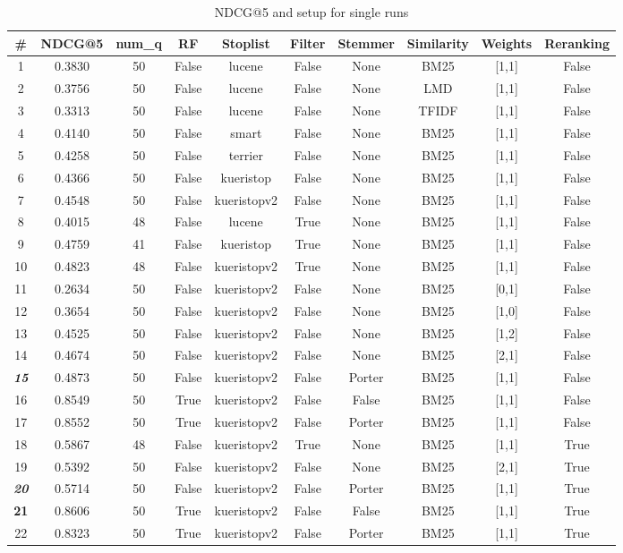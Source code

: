 \begin{table}[b]
	\caption{NDCG@5 and setup for single runs}
	\label{tab:results-table}
	\centering
	\begin{tabular}{|c||c|c||c|c|c|c|c|c|c|}
		\toprule
		\# & NDCG@5 & num\_q  & RF & Stoplist & Filter & Stemmer & Similarity & Weights & Reranking \\
		\midrule
		1 & 0.3830 & 50 & False & lucene & False & None & BM25 & [1,1] & False \\
		2 & 0.3756 & 50 & False & lucene & False & None & LMD & [1,1] & False \\
		3 & 0.3313 & 50 & False & lucene & False & None & TFIDF & [1,1] & False \\
		\hline
		4 & 0.4140 & 50 & False & smart & False & None & BM25 & [1,1] & False \\
		5 & 0.4258 & 50 & False & terrier & False & None & BM25 & [1,1] & False \\
		6 & 0.4366 & 50 & False & kueristop & False & None & BM25 & [1,1] & False \\
		7 & 0.4548 & 50 & False & kueristopv2 & False & None & BM25 & [1,1] & False \\
		\hline
		8 & 0.4015 & 48 & False & lucene & True & None & BM25 & [1,1] & False \\
		9 & 0.4759 & 41 & False & kueristop & True & None & BM25 & [1,1] & False \\
		10 & 0.4823 & 48 & False & kueristopv2 & True & None & BM25 & [1,1] & False \\
		\hline
		11 & 0.2634 & 50 & False & kueristopv2 & False & None & BM25 & [0,1] & False \\
		12 & 0.3654 & 50 & False & kueristopv2 & False & None & BM25 & [1,0] & False \\
		13 & 0.4525 & 50 & False & kueristopv2 & False & None & BM25 & [1,2] & False \\
		14 & 0.4674 & 50 & False & kueristopv2 & False & None & BM25 & [2,1] & False \\
		\hline
		\textit{\textbf{15}} & 0.4873 & 50 & False & kueristopv2 & False & Porter & BM25 & [1,1] & False \\
		\hline
		16 & 0.8549 & 50 & True & kueristopv2 & False & False & BM25 & [1,1] & False \\
		17 & 0.8552 & 50 & True & kueristopv2 & False & Porter & BM25 & [1,1] & False \\
		\hline
		18 & 0.5867 & 48 & False & kueristopv2 & True & None & BM25 & [1,1] & True \\
		19 & 0.5392 & 50 & False & kueristopv2 & False & None & BM25 & [2,1] & True \\
		\textit{\textbf{20}} & 0.5714 & 50 & False & kueristopv2 & False & Porter & BM25 & [1,1] & True \\
		\textbf{21} & 0.8606 & 50 & True & kueristopv2 & False & False & BM25 & [1,1] & True \\
		22 & 0.8323 & 50 & True & kueristopv2 & False & Porter & BM25 & [1,1] & True \\
		\bottomrule
	\end{tabular}
\end{table}


